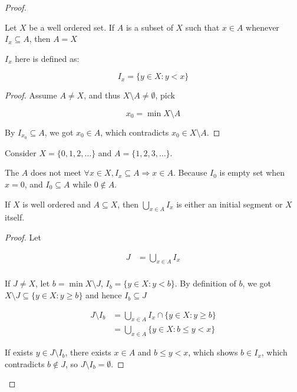 \begin{proof}
\begin{thm}
    Let $X$ be a well ordered set. If $A$ is a subset
    of $X$ such that $x \in A$ whenever $I_x \subseteq A$, then $A = X$

    $I_x$ here is defined as:

    \[
        I_x = \{ y \in X: y < x  \}
    \]
\end{thm}

\begin{proof}
    Assume $A \ne X$, and thus $X \setminus A \ne \emptyset$, pick 

    \[
        x_0 = \min X \setminus A
    \]

    By $I_{x_0} \subseteq A$, we got $x_0 \in A$, which contradicts $x_0 \in X \setminus A$.
\end{proof}

\begin{example}
    Consider $X = \{ 0,1,2, \dots \}$ and $A = \{ 1,2,3, \dots \}$. 

    The $A$ does not meet $\forall x \in X, I_x \subseteq A \Rightarrow x \in A$. Because $I_0$
    is empty set when $x=0$, and $I_0 \subseteq A$ while $0 \notin A$.
\end{example}

\begin{thm}
    If $X$ is well ordered and $A \subseteq X$, then $\bigcup_{x \in A} I_x$
    is either an initial segment or $X$ itself.
\end{thm}

\begin{proof}
    Let 
    
    \begin{align*}
        J &= \bigcup_{x \in A} I_x \\
    \end{align*}

    If $J \ne X$, let $b = \min X \setminus J$, $I_b = \{ y \in X:  y <  b\}$. 
    By definition of $b$, we got $X \setminus J \subseteq \{ y \in X: y \ge b\}$
    and hence $I_b \subseteq J$


        \begin{align*}
            J \setminus I_b &= \bigcup_{x \in A} I_x \cap \{ y \in X: y \ge b\} \\
            &= \bigcup_{x \in A} \{y \in X: b \le y < x\}
        \end{align*}

    If exists $y \in J \setminus I_b$, there exists $x \in A$ and $b \le y < x$, which shows $b \in I_x$, which 
    contradicts $b \notin J$, so $J \setminus I_b = \emptyset$.


\end{proof}
\end{proof}
